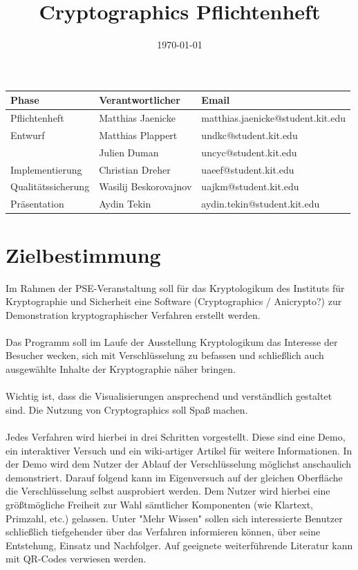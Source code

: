 \documentclass{article}
\title{Cryptographics Pflichtenheft}
\author{}
\date{\today}
\begin{document}
\maketitle
\begin{table}[b]
  \begin{tabular}{| l | l | l |}
    \hline
    \textbf{Phase} & \textbf{Verantwortlicher} & \textbf{Email} \\ \hline
    Pflichtenheft & Matthias Jaenicke & matthias.jaenicke@student.kit.edu \\ \hline
    Entwurf & Matthias Plappert & undkc@student.kit.edu \\
            & Julien Duman & uncyc@student.kit.edu \\ \hline
    Implementierung & Christian Dreher & uaeef@student.kit.edu \\ \hline
    Qualitätssicherung & Wasilij Beskorovajnov & uajkm@student.kit.edu \\ \hline
    Präsentation & Aydin Tekin & aydin.tekin@student.kit.edu \\ \hline
    \end{tabular}
\end{table}
\newpage

\tableofcontents
\newpage

\section{Zielbestimmung}


Im Rahmen der PSE-Veranstaltung soll für das Kryptologikum des Instituts für 
Kryptographie und Sicherheit eine Software (Cryptographics / Anicrypto?) zur 
Demonstration kryptographischer Verfahren erstellt werden. \\
\\
Das Programm soll im Laufe der Ausstellung Kryptologikum das Interesse der Besucher wecken, sich mit Verschlüsselung zu befassen und schließlich auch ausgewählte Inhalte der Kryptographie näher bringen. \\
\\
Wichtig ist, dass die Visualisierungen ansprechend und verständlich gestaltet sind. Die Nutzung von Cryptographics soll Spaß machen. \\
\\
Jedes Verfahren wird hierbei in drei Schritten vorgestellt. Diese sind eine Demo, ein interaktiver Versuch und ein wiki-artiger Artikel für weitere Informationen.
In der Demo wird dem Nutzer der Ablauf der Verschlüsselung möglichst anschaulich demonstriert. Darauf folgend kann im Eigenversuch auf der gleichen Oberfläche die Verschlüsselung selbst ausprobiert werden. Dem Nutzer wird hierbei eine größtmögliche Freiheit zur Wahl sämtlicher Komponenten (wie Klartext, Primzahl, etc.) gelassen. Unter "Mehr Wissen" sollen sich interessierte Benutzer schließlich tiefgehender über das Verfahren informieren können, über seine Entstehung, Einsatz und Nachfolger. Auf geeignete weiterführende Literatur kann mit QR-Codes verwiesen werden. \\
\end{document}
